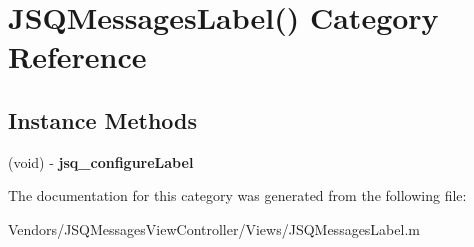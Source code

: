 \hypertarget{category_j_s_q_messages_label_07_08}{}\section{J\+S\+Q\+Messages\+Label() Category Reference}
\label{category_j_s_q_messages_label_07_08}
\subsection*{Instance Methods}
\begin{DoxyCompactItemize}
\item 
\hypertarget{category_j_s_q_messages_label_07_08_a623da70309d731c7e4acb8d175e4e213}{}(void) -\/ {\bfseries jsq\+\_\+configure\+Label}\label{category_j_s_q_messages_label_07_08_a623da70309d731c7e4acb8d175e4e213}

\end{DoxyCompactItemize}


The documentation for this category was generated from the following file\+:\begin{DoxyCompactItemize}
\item 
Vendors/\+J\+S\+Q\+Messages\+View\+Controller/\+Views/J\+S\+Q\+Messages\+Label.\+m\end{DoxyCompactItemize}
